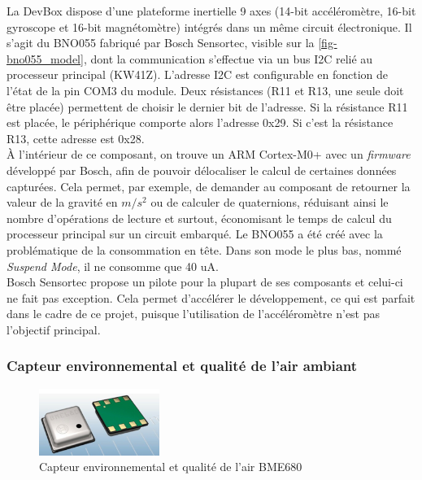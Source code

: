 La DevBox dispose d'une plateforme inertielle 9 axes (14-bit accéléromètre, 16-bit gyroscope et 16-bit magnétomètre) intégrés dans un même circuit électronique. Il s'agit du BNO055 fabriqué par Bosch Sensortec, visible sur la \cref{fig-bno055_model}, dont la communication s'effectue via un bus I2C relié au processeur principal (KW41Z). L'adresse I2C est configurable en fonction de l'état de la pin COM3 du module. Deux résistances (R11 et R13, une seule doit être placée) permettent de choisir le dernier bit de l'adresse. Si la résistance R11 est placée, le périphérique comporte alors l'adresse 0x29. Si c'est la résistance R13, cette adresse est 0x28. \\

À l'intérieur de ce composant, on trouve un ARM Cortex-M0+ avec un \textit{firmware} développé par Bosch, afin de pouvoir délocaliser le calcul de certaines données capturées. Cela permet, par exemple, de demander au composant de retourner la valeur de la gravité en $m/s^2$ ou de calculer de quaternions, réduisant ainsi le nombre d'opérations de lecture et surtout, économisant le temps de calcul du processeur principal sur un circuit embarqué. Le BNO055 a été créé avec la problématique de la consommation en tête. Dans son mode le plus bas, nommé \textit{Suspend Mode}, il ne consomme que 40 uA. \\

Bosch Sensortec propose un pilote pour la plupart de ses composants et celui-ci ne fait pas exception. Cela permet d'accélérer le développement, ce qui est parfait dans le cadre de ce projet, puisque l'utilisation de l'accéléromètre n'est pas l'objectif principal. \\


\subsubsection{Capteur environnemental et qualité de l'air ambiant}
\label{sec-hardware_bme680}

\begin{figure}[ht!]
    \centering
    \includegraphics[width=0.35\textwidth]{Figures/Hardware/bme680_model.png}
    \caption{Capteur environnemental et qualité de l'air BME680}
    \label{fig-bme680_model}
\end{figure}

